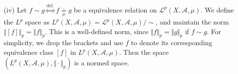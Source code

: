 \documentclass{article}
\begin{document}
\begin{itemize}
\begin{itemize}
\begin{proof}
\begin{align*}
    	\underbrace{\log\left(\frac{a^p}{p} + \frac{b^q}{q}\right)\geq \frac{1}{p}\log(a^p) +\frac{1}{q}\log(b^q)}_{\text{Concavity of the logarithmic function}}\ \Rightarrow\ ab \leq \frac{a^p}{p} + \frac{b^q}{q}.
    \end{align*}
    Then we have
    \begin{align*}
    	\vert f(x)g(x)\vert\leq \frac{\vert f(x)\vert^p}{p} + \frac{\vert g(x)\vert^q}{q}\ \overset{\text{Integration}}{\Rightarrow}\ \int \left\vert fg\right\vert d\mu \leq \frac{\Vert f\Vert^p}{p} + \frac{\Vert g\Vert^q}{q} = 1,
    \end{align*}
    which concludes the proof.
    \end{proof}
	\item[$\bullet$] (Minkowski's inquality). For all $p\geq 1$, we have
	\begin{align*}
		\Vert f+g\Vert_p \leq \Vert f\Vert_p + \Vert g\Vert_p.
	\end{align*}
    \begin{proof}
    We only prove the case $p>1$. Let $q=\frac{p}{p-1}$, then
    \begin{align*}
    	\Vert f+g\Vert_p^p &\leq \int_X\left\vert f\right\vert\cdot\left\vert f+g\right\vert^{p-1} d\mu + \int_X\left\vert g\right\vert\cdot\left\vert f+g\right\vert^{p-1} d\mu \\
    	&\leq (\Vert f\Vert_p+\Vert g\Vert_p)\left(\int_X \vert f+g\vert^{(p-1)q}d\mu\right)^{1/q}\tag{By Hölder's inquality}\\
    	&\leq (\Vert f\Vert_p+\Vert g\Vert_p)\cdot\Vert f+g\Vert_p^{p/q}.
    \end{align*}
    Note that $p-p/q = 1$, then we conclude the proof.
    \end{proof}
\end{itemize}
\vspace{0.1cm}
\item[(iv)]
Let $f\sim g\overset{\mathrm{def.}}{\Leftrightarrow} f\underset{\mu}{\overset{\cdot}{=}}g$ be a equivalence relation on $\mathcal{L}^p(X,\mathscr{A},\mu)$. We define the $L^p$ space as $L^p(X,\mathscr{A},\mu)=\mathcal{L}^p(X,\mathscr{A},\mu)/\sim$, and maintain the norm $\Vert[f]\Vert_p=\Vert f\Vert_p$. This is a well-defined norm, since $\Vert f\Vert_p = \Vert g\Vert_p$ if $f\sim g$. For simplicity, we drop the brackets and use $f$ to denote its corresponding equivalence class $[f]$ in $L^p(X,\mathscr{A},\mu)$. Then the space $(L^p(X,\mathscr{A},\mu),\Vert\cdot\Vert_p)$ is a normed space.
\vspace{0.1cm}

\end{itemize}
\end{document}
